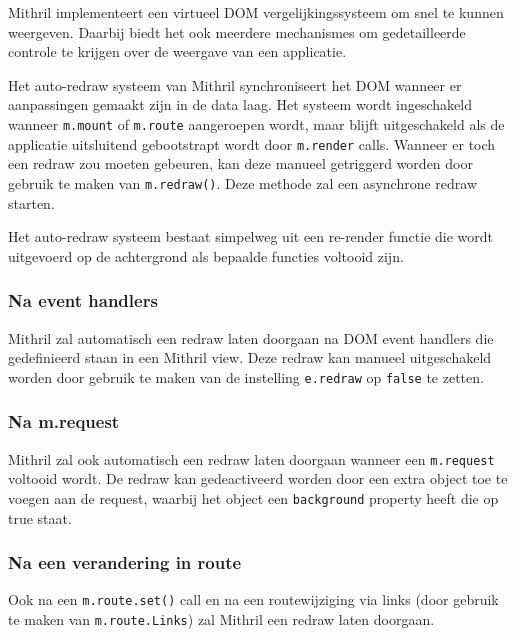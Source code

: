 Mithril implementeert een virtueel DOM vergelijkingssysteem om snel te kunnen weergeven. Daarbij biedt het ook meerdere mechanismes om gedetailleerde controle te krijgen over de weergave van een applicatie. \autocite{Mithril2019f}

Het auto-redraw systeem van Mithril synchroniseert het DOM wanneer er aanpassingen gemaakt zijn in de data laag. Het systeem wordt ingeschakeld wanneer \texttt{m.mount} of \texttt{m.route} aangeroepen wordt, maar blijft uitgeschakeld als de applicatie uitsluitend gebootstrapt wordt door \texttt{m.render} calls. Wanneer er toch een redraw zou moeten gebeuren, kan deze manueel getriggerd worden door gebruik te maken van \texttt{m.redraw()}. Deze methode zal een asynchrone redraw starten. \autocite{Mithril2019f}

Het auto-redraw systeem bestaat simpelweg uit een re-render functie die wordt uitgevoerd op de achtergrond als bepaalde functies voltooid zijn. \autocite{Mithril2019f}

\subsubsection{Na event handlers}

Mithril zal automatisch een redraw laten doorgaan na DOM event handlers die gedefinieerd staan in een Mithril view. Deze redraw kan manueel uitgeschakeld worden door gebruik te maken van de instelling \texttt{e.redraw} op \texttt{false} te zetten.  \autocite{Mithril2019f}

\subsubsection{Na m.request}

Mithril zal ook automatisch een redraw laten doorgaan wanneer een \texttt{m.request} voltooid wordt. De redraw kan gedeactiveerd worden door een extra object toe te voegen aan de request, waarbij het object een \texttt{background} property heeft die op true staat. \autocite{Mithril2019f}


\subsubsection{Na een verandering in route}

Ook na een \texttt{m.route.set()} call en na een routewijziging via links (door gebruik te maken van \texttt{m.route.Links}) zal Mithril een redraw laten doorgaan. \autocite{Mithril2019f}



